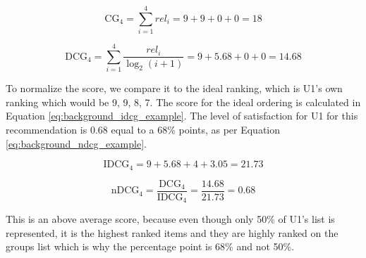 \begin{equation}\label{eq:background_cg_example}
\text{CG}_4 = \sum_{i=1}^{4}\textit{rel}_i = 9 + 9 + 0 + 0 = 18
\end{equation}

\begin{equation}\label{eq:background_dcg_example}
\text{DCG}_4 = \sum_{i=1}^{4}\frac{\textit{rel}_i}{\log_2(i + 1)}
= 9 + 5.68 + 0 + 0 = 14.68
\end{equation}

To normalize the score, we compare it to the ideal ranking, which is U1's own ranking which would be 9, 9, 8, 7. The score for the ideal ordering is calculated in Equation \ref{eq:background_idcg_example}. The level of satisfaction for U1 for this recommendation is $0.68$ equal to a 68\% points, as per Equation \ref{eq:background_ndcg_example}. 

\begin{equation}\label{eq:background_idcg_example}
\text{IDCG}_4 = 9 + 5.68 + 4 + 3.05 = 21.73
\end{equation}

\begin{equation}\label{eq:background_ndcg_example}
\text{nDCG}_4 = \frac{\text{DCG}_4}{\text{IDCG}_4} = \frac{14.68}{21.73}=0.68
\end{equation}

This is an above average score, because even though only 50\% of U1's list is represented, it is the highest ranked items and they are highly ranked on the groups list which is why the percentage point is 68\% and not 50\%. 
